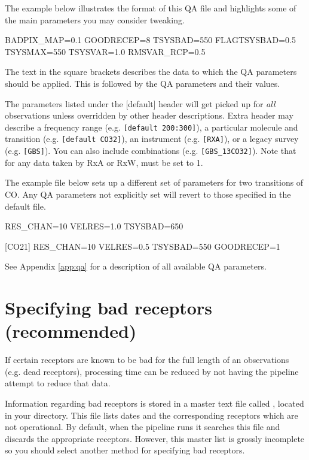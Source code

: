 \documentclass[11pt,oneside,chapters]{starlink}
\begin{document}
The example below illustrates the format of this QA file and
highlights some of the main parameters you may consider tweaking.

\vspace{0.2cm}
\begin{terminalv}
[default]
BADPIX_MAP=0.1
GOODRECEP=8
TSYSBAD=550
FLAGTSYSBAD=0.5
TSYSMAX=550
TSYSVAR=1.0
RMSVAR_RCP=0.5
\end{terminalv}
The text in the square brackets describes the data to which the QA
parameters should be applied. This is followed by the QA parameters
and their values.

The parameters listed under the [default] header will get picked up
for \textit{all} observations unless overridden by other header
descriptions. Extra header may describe a frequency range (e.g.
\texttt{[default 200:300]}), a particular molecule and transition
(e.g. \texttt{[default CO32]}), an instrument (e.g. \texttt{[RXA]}),
or a legacy survey (e.g. \texttt{[GBS]}). You can also include
combinations (e.g. \texttt{[GBS\_13CO32]}). Note that for any data
taken by RxA or RxW,  must be set to 1.

The example file below sets up a different set of parameters for two
transitions of CO. Any QA parameters not explicitly set will revert to
those specified in the default  file.

\vspace{0.2cm}
\begin{terminalv}
[C18O32]
RES_CHAN=10
VELRES=1.0
TSYSBAD=650

[CO21]
RES_CHAN=10
VELRES=0.5
TSYSBAD=550
GOODRECEP=1
\end{terminalv}

See Appendix \ref{app:qa} for a description of all available QA parameters.


\section{Specifying bad receptors (recommended)}
\label{sec:badrec}

If certain receptors are known to be bad for the full length of an
observations (e.g. dead receptors), processing time can be reduced by
not having the pipeline attempt to reduce that data.

Information regarding bad receptors is stored in a master text file
called , located in your
 directory. This file lists dates and the
corresponding receptors which are not operational. By default, when
the pipeline runs it searches this file and discards the appropriate
receptors. However, this master list is grossly incomplete so you
should select another method for specifying bad receptors.
\end{document}
